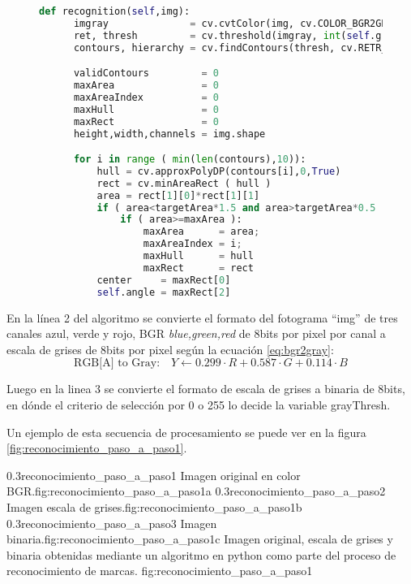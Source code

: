 \begin{figure}[h]
   \begin{lstlisting}[language=python,caption={Algoritmo principal de reconocimiento de marcas en un fotograma},label={cod:reconocimiento2}]
def recognition(self,img):
      imgray              = cv.cvtColor(img, cv.COLOR_BGR2GRAY)
      ret, thresh         = cv.threshold(imgray, int(self.grayThresh), 0xff, cv.THRESH_BINARY_INV)
      contours, hierarchy = cv.findContours(thresh, cv.RETR_EXTERNAL, cv.CHAIN_APPROX_SIMPLE)

      validContours         = 0
      maxArea               = 0
      maxAreaIndex          = 0
      maxHull               = 0
      maxRect               = 0
      height,width,channels = img.shape

      for i in range ( min(len(contours),10)):
          hull = cv.approxPolyDP(contours[i],0,True) 
          rect = cv.minAreaRect ( hull )
          area = rect[1][0]*rect[1][1]
          if ( area<targetArea*1.5 and area>targetArea*0.5 ):
              if ( area>=maxArea ):
                  maxArea      = area;
                  maxAreaIndex = i;
                  maxHull      = hull
                  maxRect      = rect
          center     = maxRect[0]
          self.angle = maxRect[2]
   \end{lstlisting}
\end{figure}

En la línea 2 del algoritmo se convierte el formato del fotograma ``img'' de tres canales azul, verde y rojo, BGR \textit{blue,green,red} de 8bits por pixel por canal a escala de grises de 8bits por pixel según la ecuación \ref{eq:bgr2gray}:
\begin{equation}
   \text{RGB[A] to Gray:} \quad Y \leftarrow 0.299 \cdot R + 0.587 \cdot G + 0.114 \cdot B
   \label{eq:bgr2gray}
\end{equation}

  Luego en la linea 3 se convierte el formato de escala de grises a binaria de 8bits, en dónde el criterio de selección por 0 o 255 lo decide la variable grayThresh.\par
  Un ejemplo de esta secuencia de procesamiento se puede ver en la figura \ref{fig:reconocimiento_paso_a_paso1}.

\subfigabc
         {0.3}{reconocimiento_paso_a_paso1} {Imagen original en color BGR.}{fig:reconocimiento_paso_a_paso1a}
         {0.3}{reconocimiento_paso_a_paso2} {Imagen escala de grises.}{fig:reconocimiento_paso_a_paso1b}
         {0.3}{reconocimiento_paso_a_paso3} {Imagen binaria.}{fig:reconocimiento_paso_a_paso1c}
         {Imagen original, escala de grises y binaria obtenidas mediante un algoritmo en python como parte del proceso de reconocimiento de marcas.}
         {fig:reconocimiento_paso_a_paso1}

